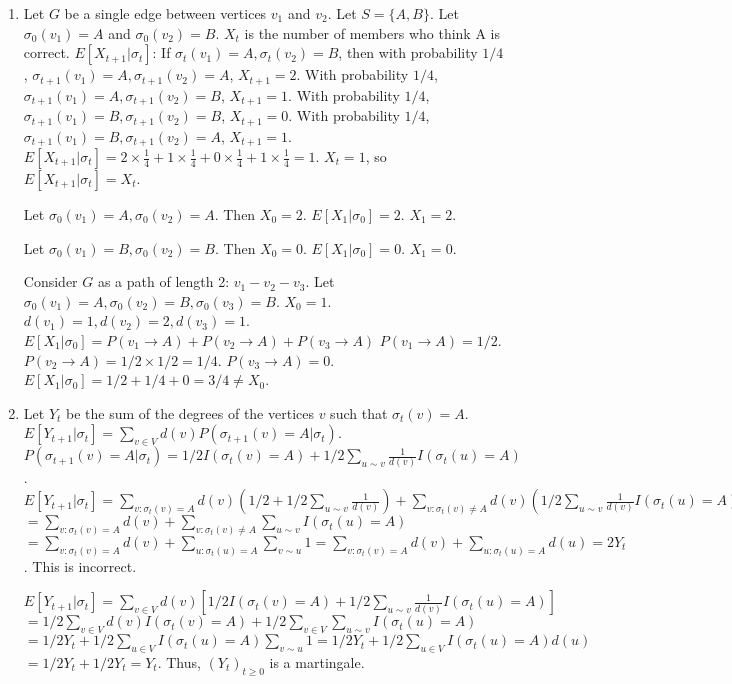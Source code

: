 \begin{enumerate}
\begin{shaded}
\begin{enumerate}
\item {} Let $G$ be a single edge between vertices $v_1$ and $v_2$. Let $S = \{A, B\}$. Let $\sigma_0(v_1) = A$ and $\sigma_0(v_2) = B$.
$X_t$ is the number of members who think A is correct.
$E[X_{t+1} | \sigma_t]$:
If $\sigma_t(v_1) = A, \sigma_t(v_2) = B$, then with probability $1/4$, $\sigma_{t+1}(v_1) = A, \sigma_{t+1}(v_2) = A$, $X_{t+1} = 2$.
With probability $1/4$, $\sigma_{t+1}(v_1) = A, \sigma_{t+1}(v_2) = B$, $X_{t+1} = 1$.
With probability $1/4$, $\sigma_{t+1}(v_1) = B, \sigma_{t+1}(v_2) = B$, $X_{t+1} = 0$.
With probability $1/4$, $\sigma_{t+1}(v_1) = B, \sigma_{t+1}(v_2) = A$, $X_{t+1} = 1$.
$E[X_{t+1} | \sigma_t] = 2 \times \frac{1}{4} + 1 \times \frac{1}{4} + 0 \times \frac{1}{4} + 1 \times \frac{1}{4} = 1$.
$X_t = 1$, so $E[X_{t+1} | \sigma_t] = X_t$.

Let $\sigma_0(v_1) = A, \sigma_0(v_2) = A$. Then $X_0 = 2$.
$E[X_1 | \sigma_0] = 2$. $X_1 = 2$.

Let $\sigma_0(v_1) = B, \sigma_0(v_2) = B$. Then $X_0 = 0$.
$E[X_1 | \sigma_0] = 0$. $X_1 = 0$.

Consider $G$ as a path of length 2: $v_1 - v_2 - v_3$. Let $\sigma_0(v_1) = A, \sigma_0(v_2) = B, \sigma_0(v_3) = B$. $X_0 = 1$.
$d(v_1) = 1, d(v_2) = 2, d(v_3) = 1$.
$E[X_1 | \sigma_0] = P(v_1 \to A) + P(v_2 \to A) + P(v_3 \to A)$
$P(v_1 \to A) = 1/2$.
$P(v_2 \to A) = 1/2 \times 1/2 = 1/4$.
$P(v_3 \to A) = 0$.
$E[X_1 | \sigma_0] = 1/2 + 1/4 + 0 = 3/4 \neq X_0$.

\item {} Let $Y_t$ be the sum of the degrees of the vertices $v$ such that $\sigma_t(v) = A$.
$E[Y_{t+1} | \sigma_t] = \sum_{v \in V} d(v) P(\sigma_{t+1}(v) = A | \sigma_t)$.
$P(\sigma_{t+1}(v) = A | \sigma_t) = 1/2 I(\sigma_t(v) = A) + 1/2 \sum_{u \sim v} \frac{1}{d(v)} I(\sigma_t(u) = A)$.
$E[Y_{t+1} | \sigma_t] = \sum_{v: \sigma_t(v) = A} d(v) (1/2 + 1/2 \sum_{u \sim v} \frac{1}{d(v)}) + \sum_{v: \sigma_t(v) \neq A} d(v) (1/2 \sum_{u \sim v} \frac{1}{d(v)} I(\sigma_t(u) = A))$
$= \sum_{v: \sigma_t(v) = A} d(v) + \sum_{v: \sigma_t(v) \neq A} \sum_{u \sim v} I(\sigma_t(u) = A)$
$= \sum_{v: \sigma_t(v) = A} d(v) + \sum_{u: \sigma_t(u) = A} \sum_{v \sim u} 1 = \sum_{v: \sigma_t(v) = A} d(v) + \sum_{u: \sigma_t(u) = A} d(u) = 2 Y_t$. This is incorrect.

$E[Y_{t+1} | \sigma_t] = \sum_{v \in V} d(v) [1/2 I(\sigma_t(v) = A) + 1/2 \sum_{u \sim v} \frac{1}{d(v)} I(\sigma_t(u) = A)]$
$= 1/2 \sum_{v \in V} d(v) I(\sigma_t(v) = A) + 1/2 \sum_{v \in V} \sum_{u \sim v} I(\sigma_t(u) = A)$
$= 1/2 Y_t + 1/2 \sum_{u \in V} I(\sigma_t(u) = A) \sum_{v \sim u} 1 = 1/2 Y_t + 1/2 \sum_{u \in V} I(\sigma_t(u) = A) d(u)$
$= 1/2 Y_t + 1/2 Y_t = Y_t$.
Thus, $(Y_t)_{t\geq 0}$ is a martingale.


\end{enumerate}
\end{shaded}
\end{enumerate}
